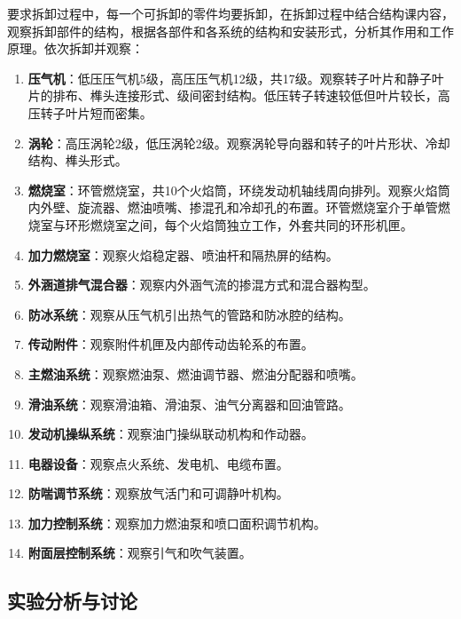 要求拆卸过程中，每一个可拆卸的零件均要拆卸，在拆卸过程中结合结构课内容，观察拆卸部件的结构，根据各部件和各系统的结构和安装形式，分析其作用和工作原理。依次拆卸并观察：

\begin{enumerate}
    \item \textbf{压气机}：低压压气机5级，高压压气机12级，共17级。观察转子叶片和静子叶片的排布、榫头连接形式、级间密封结构。低压转子转速较低但叶片较长，高压转子叶片短而密集。
    \item \textbf{涡轮}：高压涡轮2级，低压涡轮2级。观察涡轮导向器和转子的叶片形状、冷却结构、榫头形式。
    \item \textbf{燃烧室}：环管燃烧室，共10个火焰筒，环绕发动机轴线周向排列。观察火焰筒内外壁、旋流器、燃油喷嘴、掺混孔和冷却孔的布置。环管燃烧室介于单管燃烧室与环形燃烧室之间，每个火焰筒独立工作，外套共同的环形机匣。
    \item \textbf{加力燃烧室}：观察火焰稳定器、喷油杆和隔热屏的结构。
    \item \textbf{外涵道排气混合器}：观察内外涵气流的掺混方式和混合器构型。
    \item \textbf{防冰系统}：观察从压气机引出热气的管路和防冰腔的结构。
    \item \textbf{传动附件}：观察附件机匣及内部传动齿轮系的布置。
    \item \textbf{主燃油系统}：观察燃油泵、燃油调节器、燃油分配器和喷嘴。
    \item \textbf{滑油系统}：观察滑油箱、滑油泵、油气分离器和回油管路。
    \item \textbf{发动机操纵系统}：观察油门操纵联动机构和作动器。
    \item \textbf{电器设备}：观察点火系统、发电机、电缆布置。
    \item \textbf{防喘调节系统}：观察放气活门和可调静叶机构。
    \item \textbf{加力控制系统}：观察加力燃油泵和喷口面积调节机构。
    \item \textbf{附面层控制系统}：观察引气和吹气装置。
\end{enumerate}

\subsection{实验分析与讨论}

